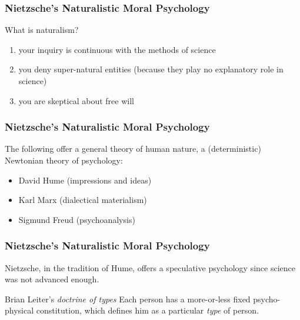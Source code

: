 \documentclass[xcolor=dvipsnames]{beamer}
\begin{document}

\begin{frame}
  \frametitle{Nietzsche's Naturalistic Moral Psychology}
  What is naturalism?
  \begin{enumerate}
  \item your inquiry is continuous with the methods of science
  \item you deny super-natural entities (because they play no
    explanatory role in science)
  \item you are skeptical about free will 
  \end{enumerate}
\end{frame}

\begin{frame}
  \frametitle{Nietzsche's Naturalistic Moral Psychology}
  The following offer a general theory of human nature, a
  (deterministic) Newtonian theory of psychology:
  \begin{itemize}
  \item David Hume (impressions and ideas)
  \item Karl Marx (dialectical materialism)
  \item Sigmund Freud (psychoanalysis)
  \end{itemize}
\end{frame}

\begin{frame}
  \frametitle{Nietzsche's Naturalistic Moral Psychology}
Nietzsche, in the tradition of Hume, offers a speculative psychology
since science was not advanced enough.
  \begin{block}{  Brian Leiter's \emph{doctrine of types}}
    Each person has a more-or-less fixed psycho-physical constitution,
    which defines him as a particular \emph{type} of person.
  \end{block}
\end{frame}
\end{document}

